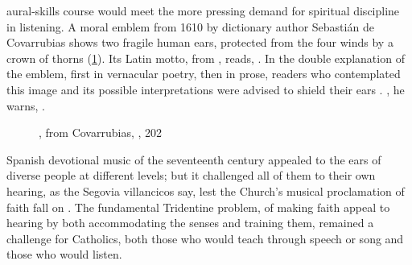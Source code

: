 aural-skills course would meet the more pressing demand for spiritual discipline
in listening.
A moral emblem from 1610 by dictionary author Sebastián de Covarrubias shows two
fragile human ears, protected from the four winds by a crown of thorns
(\cref{fig:Covarrubias-Emblemas-202-ears-thorns}).
Its Latin motto, from , reads, .%
    \Autocite
    [202: .]
    {Covarrubias:Emblemas}
In the double explanation of the emblem, first in vernacular poetry, then in
prose, readers who contemplated this image and its possible interpretations were
advised to shield their ears .%
    \Autocite
    [203: .] 
    {Covarrubias:Emblemas}
, he warns, .%
    \Autocite
    [202: .] 
    {Covarrubias:Emblemas}

\begin{figure}
    \caption{, from
    Covarrubias, , 202}

    \label{fig:Covarrubias-Emblemas-202-ears-thorns}
\end{figure}

Spanish devotional music of the seventeenth century appealed to the ears of
diverse people at different levels; but it challenged all of them to
 their own hearing, as the Segovia villancicos say, lest the
Church's musical proclamation of faith fall on .
The fundamental Tridentine problem, of making faith appeal to hearing by both
accommodating the senses and training them, remained a challenge for Catholics,
both those who would teach through speech or song and those who would listen.


\endinput
